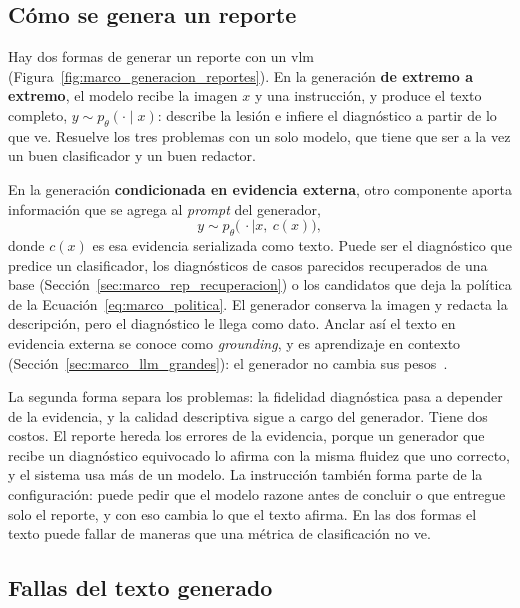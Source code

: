 \subsection{Cómo se genera un reporte}
\label{sec:marco_rep_generacion}

Hay dos formas de generar un reporte con un \gls{vlm} (Figura~\ref{fig:marco_generacion_reportes}). En la
generación \textbf{de extremo a extremo}, el modelo recibe la imagen $x$ y una instrucción, y produce el texto
completo, $y \sim p_\theta(\cdot \mid x)$: describe la lesión e infiere el diagnóstico a partir de lo que ve.
Resuelve los tres problemas con un solo modelo, que tiene que ser a la vez un buen clasificador y un buen
redactor.



En la generación \textbf{condicionada en evidencia externa}, otro componente aporta información que se agrega al
\emph{prompt} del generador,
\begin{equation}
    y \sim p_\theta\bigl(\,\cdot \mid x,\ c(x)\bigr),
    \label{eq:marco_rep_condicionada}
\end{equation}
donde $c(x)$ es esa evidencia serializada como texto. Puede ser el diagnóstico que predice un clasificador, los
diagnósticos de casos parecidos recuperados de una base (Sección~\ref{sec:marco_rep_recuperacion}) o los
candidatos que deja la política de la Ecuación~\ref{eq:marco_politica}. El generador conserva la imagen y
redacta la descripción, pero el diagnóstico le llega como dato. Anclar así el texto en evidencia externa se
conoce como \emph{grounding}, y es aprendizaje en contexto (Sección~\ref{sec:marco_llm_grandes}): el
generador no cambia sus pesos~\cite{brown2020language}.

La segunda forma separa los problemas: la fidelidad diagnóstica pasa a depender de la evidencia, y la calidad
descriptiva sigue a cargo del generador. Tiene dos costos. El reporte hereda los errores de la evidencia,
porque un generador que recibe un diagnóstico equivocado lo afirma con la misma fluidez que uno correcto, y el
sistema usa más de un modelo. La instrucción también forma parte de la configuración: puede pedir que el
modelo razone antes de concluir o que entregue solo el reporte, y con eso cambia lo que el texto afirma. En las
dos formas el texto puede fallar de maneras que una métrica de clasificación no ve.

\subsection{Fallas del texto generado}
\label{sec:marco_rep_fallas}

